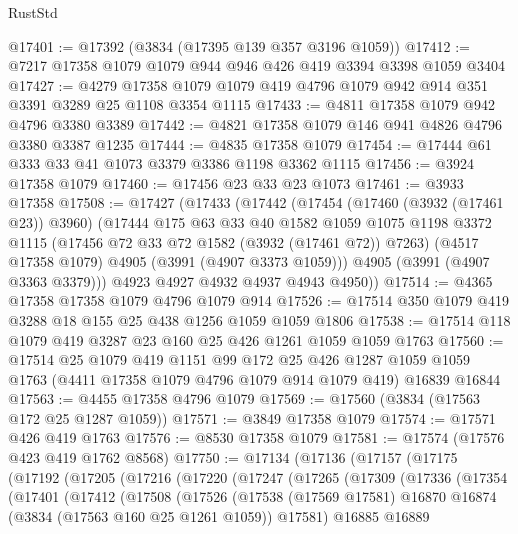 \begin{lexlean}{RustStd}
\begin{coremodule}
@17401 := @17392 (@3834 (@17395 @139 @357 @3196 @1059))
@17412 := @7217 @17358 @1079 @1079 @944 @946 @426 @419 @3394 @3398 @1059 @3404
@17427 := @4279 @17358 @1079 @1079 @419 @4796 @1079 @942 @914 @351 @3391 @3289 @25 @1108 @3354 @1115
@17433 := @4811 @17358 @1079 @942 @4796 @3380 @3389
@17442 := @4821 @17358 @1079 @146 @941 @4826 @4796 @3380 @3387 @1235
@17444 := @4835 @17358 @1079
@17454 := @17444 @61 @333 @33 @41 @1073 @3379 @3386 @1198 @3362 @1115
@17456 := @3924 @17358 @1079
@17460 := @17456 @23 @33 @23 @1073
@17461 := @3933 @17358
@17508 := @17427
    (@17433
      (@17442
        (@17454
          (@17460 (@3932 (@17461 @23)) @3960)
          (@17444
            @175
            @63
            @33
            @40
            @1582
            @1059
            @1075
            @1198
            @3372
            @1115
            (@17456 @72 @33 @72 @1582 (@3932 (@17461 @72)) @7263)
            (@4517 @17358 @1079)
            @4905
            (@3991 (@4907 @3373 @1059)))
          @4905
          (@3991 (@4907 @3363 @3379)))
        @4923
        @4927
        @4932
        @4937
        @4943
        @4950))
@17514 := @4365 @17358 @17358 @1079 @4796 @1079 @914
@17526 := @17514 @350 @1079 @419 @3288 @18 @155 @25 @438 @1256 @1059 @1059 @1806
@17538 := @17514 @118 @1079 @419 @3287 @23 @160 @25 @426 @1261 @1059 @1059 @1763
@17560 := @17514
    @25
    @1079
    @419
    @1151
    @99
    @172
    @25
    @426
    @1287
    @1059
    @1059
    @1763
    (@4411 @17358 @1079 @4796 @1079 @914 @1079 @419)
    @16839
    @16844
@17563 := @4455 @17358 @4796 @1079
@17569 := @17560 (@3834 (@17563 @172 @25 @1287 @1059))
@17571 := @3849 @17358 @1079
@17574 := @17571 @426 @419 @1763
@17576 := @8530 @17358 @1079
@17581 := @17574 (@17576 @423 @419 @1762 @8568)
@17750 := @17134
    (@17136
      (@17157
        (@17175
          (@17192
            (@17205
              (@17216
                (@17220
                  (@17247
                    (@17265
                      (@17309
                        (@17336
                          (@17354
                            (@17401
                              (@17412
                                (@17508
                                  (@17526
                                    (@17538
                                      (@17569 @17581)
                                      @16870
                                      @16874
                                      (@3834 (@17563 @160 @25 @1261 @1059))
                                      @17581)
                                    @16885
                                    @16889

\end{coremodule}
\end{lexlean}
